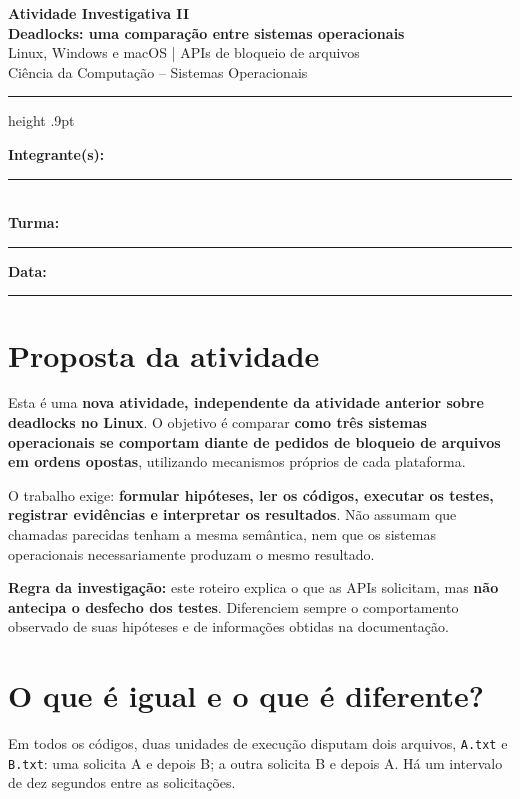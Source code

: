 \documentclass[11pt,a4paper]{article}
\newcommand{\emphbox}[1]{\vspace{2pt}\noindent\colorbox{fundo}{\parbox{\dimexpr\linewidth-2\fboxsep}{#1}}\vspace{2pt}}
\begin{document}
\begin{center}
{\Large\bfseries\color{marinho} Atividade Investigativa II}\\[3pt]
{\large\bfseries Deadlocks: uma comparação entre sistemas operacionais}\\[5pt]
{\normalsize Linux, Windows e macOS \;|\; APIs de bloqueio de arquivos}\\[5pt]
{\footnotesize Ciência da Computação \;--\; Sistemas Operacionais}
\end{center}
\vspace{1mm}
{\color{marinho}\hrule height .9pt}
\vspace{3mm}
\textbf{Integrante(s):} \rule{11.4cm}{.4pt}\\[6pt]
\textbf{Turma:} \rule{5cm}{.4pt}\hfill\textbf{Data:} \rule{4cm}{.4pt}

\section{Proposta da atividade}
Esta é uma \textbf{nova atividade, independente da atividade anterior sobre deadlocks no Linux}. O objetivo é comparar \textbf{como três sistemas operacionais se comportam diante de pedidos de bloqueio de arquivos em ordens opostas}, utilizando mecanismos próprios de cada plataforma.

O trabalho exige: \textbf{formular hipóteses, ler os códigos, executar os testes, registrar evidências e interpretar os resultados}. Não assumam que chamadas parecidas tenham a mesma semântica, nem que os sistemas operacionais necessariamente produzam o mesmo resultado.

\emphbox{\textbf{Regra da investigação:} este roteiro explica o que as APIs solicitam, mas \textbf{não antecipa o desfecho dos testes}. Diferenciem sempre o comportamento observado de suas hipóteses e de informações obtidas na documentação.}

\section{O que é igual e o que é diferente?}
Em todos os códigos, duas unidades de execução disputam dois arquivos, \texttt{A.txt} e \texttt{B.txt}: uma solicita A e depois B; a outra solicita B e depois A. Há um intervalo de dez segundos entre as solicitações.
\end{document}
